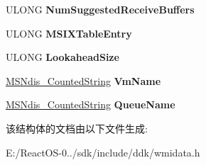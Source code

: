 \begin{DoxyCompactItemize}
\item 
\mbox{\label{struct___m_s_ndis___receive_queue_info_ac723330563256f7a8b82cfcc3cfd1cd5}} 
U\+L\+O\+NG {\bfseries Num\+Suggested\+Receive\+Buffers}
\item 
\mbox{\label{struct___m_s_ndis___receive_queue_info_a70c7854a89b88421ca794b0b0ba4d124}} 
U\+L\+O\+NG {\bfseries M\+S\+I\+X\+Table\+Entry}
\item 
\mbox{\label{struct___m_s_ndis___receive_queue_info_a44be18942d8d7eab19c70d8c3972f3b4}} 
U\+L\+O\+NG {\bfseries Lookahead\+Size}
\item 
\mbox{\label{struct___m_s_ndis___receive_queue_info_a44e09894f3f3c55a64e29e1cd6a9e72e}} 
\hyperlink{struct___m_s_ndis___counted_string}{M\+S\+Ndis\+\_\+\+Counted\+String} {\bfseries Vm\+Name}
\item 
\mbox{\label{struct___m_s_ndis___receive_queue_info_ae4d5146a12a291bc5ec0784c6695f16b}} 
\hyperlink{struct___m_s_ndis___counted_string}{M\+S\+Ndis\+\_\+\+Counted\+String} {\bfseries Queue\+Name}
\end{DoxyCompactItemize}


该结构体的文档由以下文件生成\+:\begin{DoxyCompactItemize}
\item 
E\+:/\+React\+O\+S-\/0../sdk/include/ddk/wmidata.\+h\end{DoxyCompactItemize}
